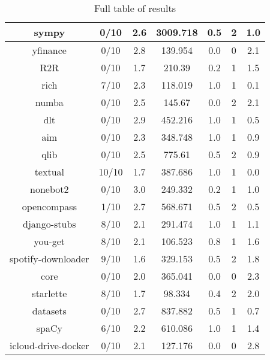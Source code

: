 \documentclass[conference]{IEEEtran}
\begin{document}
\begin{table}[!h]
\begin{tabular}{|c|c|c|c|c|c|c|}
        sympy & 0/10 & 2.6 & 3009.718 & 0.5 & 2 & 1.0 \\ \hline
        yfinance & 0/10 & 2.8 & 139.954 & 0.0 & 0 & 2.1 \\ \hline
        R2R & 0/10 & 1.7 & 210.39 & 0.2 & 1 & 1.5 \\ \hline
        rich & 7/10 & 2.3 & 118.019 & 1.0 & 1 & 0.1 \\ \hline
        numba & 0/10 & 2.5 & 145.67 & 0.0 & 2 & 2.1 \\ \hline
        dlt & 0/10 & 2.9 & 452.216 & 1.0 & 1 & 0.5 \\ \hline
        aim & 0/10 & 2.3 & 348.748 & 1.0 & 1 & 0.9 \\ \hline
        qlib & 0/10 & 2.5 & 775.61 & 0.5 & 2 & 0.9 \\ \hline
        textual & 10/10 & 1.7 & 387.686 & 1.0 & 1 & 0.0 \\ \hline
        nonebot2 & 0/10 & 3.0 & 249.332 & 0.2 & 1 & 1.0 \\ \hline
        opencompass & 1/10 & 2.7 & 568.671 & 0.5 & 2 & 0.5 \\ \hline
        django-stubs & 8/10 & 2.1 & 291.474 & 1.0 & 1 & 1.1 \\ \hline
        you-get & 8/10 & 2.1 & 106.523 & 0.8 & 1 & 1.6 \\ \hline
        spotify-downloader & 9/10 & 1.6 & 329.153 & 0.5 & 2 & 1.8 \\ \hline
        core & 0/10 & 2.0 & 365.041 & 0.0 & 0 & 2.3 \\ \hline
        starlette & 8/10 & 1.7 & 98.334 & 0.4 & 2 & 2.0 \\ \hline
        datasets & 0/10 & 2.7 & 837.882 & 0.5 & 1 & 0.7 \\ \hline
        spaCy & 6/10 & 2.2 & 610.086 & 1.0 & 1 & 1.4 \\ \hline
        icloud-drive-docker & 0/10 & 2.1 & 127.176 & 0.0 & 0 & 2.8 \\ \hline
    \end{tabular}
    \caption{Full table of results}
    \label{tab:results}
\end{table}
\end{document}

